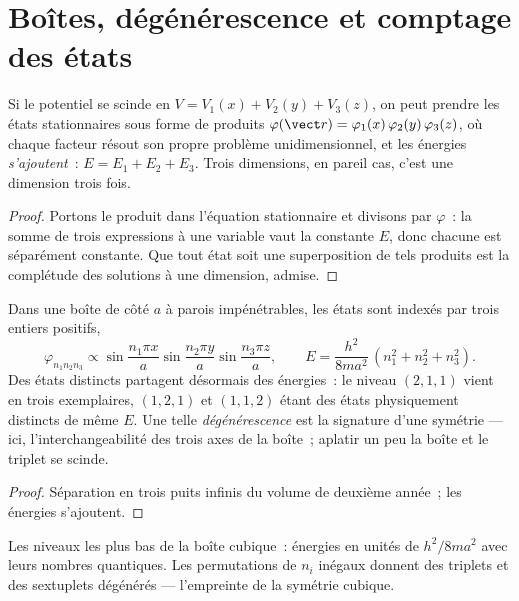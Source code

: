 \section{Boîtes, dégénérescence et comptage des états}

\begin{theorem}\label{thm:b3:schrodinger-three-dimensions:separation}
Si le potentiel se scinde en $V = V_1(x) + V_2(y) + V_3(z)$, on peut
prendre les états stationnaires sous forme de produits
$\varphi(\vect r) = \varphi_1(x)\,\varphi_2(y)\,\varphi_3(z)$, où
chaque facteur résout son propre problème unidimensionnel, et les
énergies \emph{s'ajoutent}~: $E = E_1 + E_2 + E_3$. Trois dimensions,
en pareil cas, c'est une dimension trois fois.
\end{theorem}

\begin{proof}
Portons le produit dans l'équation stationnaire et divisons par
$\varphi$~: la somme de trois expressions à une variable vaut la
constante $E$, donc chacune est séparément constante. Que tout état
soit une superposition de tels produits est la complétude des solutions
à une dimension, admise.
\end{proof}

\begin{proposition}\label{prop:b3:schrodinger-three-dimensions:box}
Dans une boîte de côté $a$ à parois impénétrables, les états sont
indexés par trois entiers positifs,
\[
\varphi_{n_1n_2n_3} \propto
\sin\frac{n_1\pi x}{a}\sin\frac{n_2\pi y}{a}\sin\frac{n_3\pi z}{a} ,
\qquad
E = \frac{h^2}{8ma^2}\,(n_1^2 + n_2^2 + n_3^2) .
\]
Des états distincts partagent désormais des énergies~: le niveau
$(2,1,1)$ vient en trois exemplaires, $(1,2,1)$ et $(1,1,2)$ étant des
états physiquement distincts de même $E$. Une telle
\emph{dégénérescence} est la signature d'une symétrie --- ici,
l'interchangeabilité des trois axes de la boîte~; aplatir un peu la
boîte et le triplet se scinde.
\end{proposition}

\begin{proof}
Séparation en trois puits infinis du volume de deuxième année~; les
énergies s'ajoutent.
\end{proof}

\begin{omfigure}

{\small Les niveaux les plus bas de la boîte cubique~: énergies en
unités de $h^2/8ma^2$ avec leurs nombres quantiques. Les permutations
de $n_i$ inégaux donnent des triplets et des sextuplets dégénérés ---
l'empreinte de la symétrie cubique.}
\end{omfigure}

